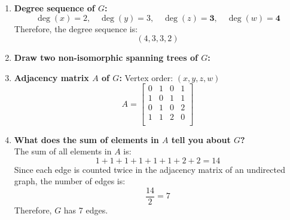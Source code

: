 \documentclass{article}
\begin{document}
\begin{enumerate}[label=\arabic*.]
  \item \textbf{Degree sequence of \( G \):}
  \[
  \deg(x) = 2, \quad \deg(y) = 3, \quad \deg(z) = \mathbf{3}, \quad \deg(w) = \mathbf{4}
  \]
  Therefore, the degree sequence is:
  \[
  (4, 3, 3, 2)
  \]

  \item \textbf{Draw two non-isomorphic spanning trees of \( G \):}

  \begin{center}
  \quad\quad
  \end{center}

  \item \textbf{Adjacency matrix \( A \) of \( G \):}  
  Vertex order: \( (x, y, z, w) \)
  \[
  A =
  \begin{bmatrix}
    0 & 1 & 0 & 1 \\
    1 & 0 & 1 & 1 \\
    0 & 1 & 0 & 2 \\
    1 & 1 & 2 & 0 \\
  \end{bmatrix}
  \]

  \item \textbf{What does the sum of elements in \( A \) tell you about \( G \)?} \\
  The sum of all elements in \( A \) is:
  \[
  1+1+1+1+1+1+2+2 = 14
  \]
  Since each edge is counted twice in the adjacency matrix of an undirected graph, the number of edges is:
  \[
  \frac{14}{2} = 7
  \]
  Therefore, \( G \) has 7 edges.
\end{enumerate}
\end{document}
